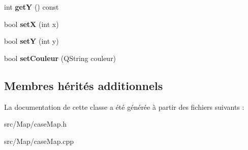 \begin{DoxyCompactItemize}
\item 
int {\bfseries getY} () const \hypertarget{class_case_map_a0a8910ab5161730d76e7d38cfd332ae1}{}\label{class_case_map_a0a8910ab5161730d76e7d38cfd332ae1}

\item 
bool {\bfseries setX} (int x)\hypertarget{class_case_map_a4b5ab60cc649cf779fca317e7701bab6}{}\label{class_case_map_a4b5ab60cc649cf779fca317e7701bab6}

\item 
bool {\bfseries setY} (int y)\hypertarget{class_case_map_a398a2dd2c220d42c8c0852b4c4b6bf4c}{}\label{class_case_map_a398a2dd2c220d42c8c0852b4c4b6bf4c}

\item 
bool {\bfseries set\+Couleur} (Q\+String couleur)\hypertarget{class_case_map_ab61c2e25a6ddcf59ddc57400caa31d48}{}\label{class_case_map_ab61c2e25a6ddcf59ddc57400caa31d48}

\end{DoxyCompactItemize}
\subsection*{Membres hérités additionnels}


La documentation de cette classe a été générée à partir des fichiers suivants \+:\begin{DoxyCompactItemize}
\item 
src/\+Map/case\+Map.\+h\item 
src/\+Map/case\+Map.\+cpp\end{DoxyCompactItemize}
